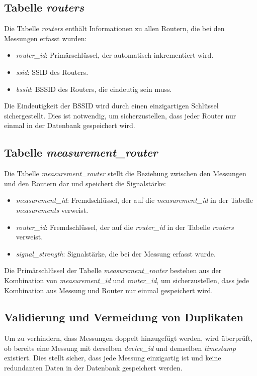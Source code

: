 \subsection{Tabelle \textit{routers}}

Die Tabelle \textit{routers} enthält Informationen zu allen Routern, die bei den Messungen erfasst wurden:
\begin{itemize}
    \item \textit{router\_id}: Primärschlüssel, der automatisch inkrementiert wird.
    \item \textit{ssid}: SSID des Routers.
    \item \textit{bssid}: BSSID des Routers, die eindeutig sein muss.
\end{itemize}

Die Eindeutigkeit der BSSID wird durch einen einzigartigen Schlüssel sichergestellt. Dies ist notwendig, um sicherzustellen, dass jeder Router nur einmal in der Datenbank gespeichert wird.

\subsection{Tabelle \textit{measurement\_router}}

Die Tabelle \textit{measurement\_router} stellt die Beziehung zwischen den Messungen und den Routern dar und speichert die Signalstärke:
\begin{itemize}
    \item \textit{measurement\_id}: Fremdschlüssel, der auf die \textit{measurement\_id} in der Tabelle \textit{measurements} verweist.
    \item \textit{router\_id}: Fremdschlüssel, der auf die \textit{router\_id} in der Tabelle \textit{routers} verweist.
    \item \textit{signal\_strength}: Signalstärke, die bei der Messung erfasst wurde.
\end{itemize}

Die Primärschlüssel der Tabelle \textit{measurement\_router} bestehen aus der Kombination von \textit{measurement\_id} und \textit{router\_id}, um sicherzustellen, dass jede Kombination aus Messung und Router nur einmal gespeichert wird.

\subsection{Validierung und Vermeidung von Duplikaten}

Um zu verhindern, dass Messungen doppelt hinzugefügt werden, wird überprüft, ob bereits eine Messung mit derselben \textit{device\_id} und demselben \textit{timestamp} existiert. Dies stellt sicher, dass jede Messung einzigartig ist und keine redundanten Daten in der Datenbank gespeichert werden.

